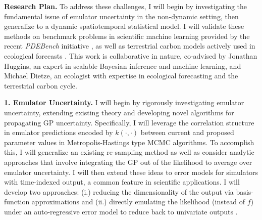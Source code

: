 \documentclass[11pt]{article}
\begin{document}

\noindent
\textbf{Research Plan.} To address these challenges, I will begin by investigating the fundamental issue of emulator uncertainty in the 
non-dynamic setting, then generalize to a dynamic spatiotemporal statistical model. I will validate these methods on benchmark problems in scientific machine learning provided by the recent \textit{PDEBench} initiative \cite{Takamoto}, as well as terrestrial carbon models actively used in ecological forecasts \cite{Dietze}. This work is collaborative in nature, co-advised by Jonathan Huggins, an expert in scalable Bayesian inference and machine learning, and Michael Dietze, an ecologist with expertise in ecological forecasting and the terrestrial carbon cycle. 

 \textbf{1. Emulator Uncertainty.} I will begin by rigorously investigating emulator uncertainty, extending existing theory \cite{Tuo} and developing novel algorithms for propagating GP uncertainty. Specifically, I will leverage the correlation structure in emulator predictions encoded by $k(\cdot, \cdot)$ between current and proposed parameter values in Metropolis-Hastings type MCMC algorithms. To accomplish this, I will generalize an existing re-sampling method \cite{Fer} as well as consider analytic approaches that involve integrating the GP out of the likelihood to average over emulator uncertainty. 
I will then extend these ideas to error models for simulators with time-indexed output, a common feature in scientific applications. I will develop two approaches: (i.) reducing the dimensionality of the output via basis-function 
 approximations and (ii.) directly emulating the likelihood (instead of $f$) under an auto-regressive error model to reduce back to univariate outputs \cite{Fer}. 
\end{document}
